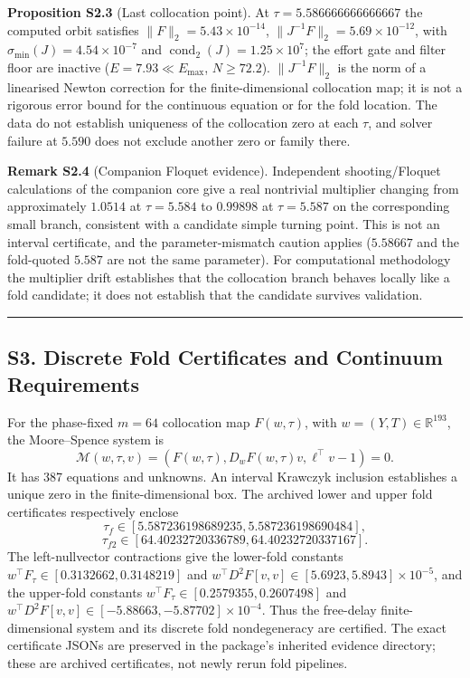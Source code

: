 \documentclass[
  10pt,
  a4paper,
]{article}
\begin{document}
\textbf{Proposition S2.3} (Last collocation point). At
\(\tau = 5.586666666666667\) the computed orbit satisfies
\(\|F\|_2 = 5.43\times10^{-14}\),
\(\|J^{-1}F\|_2 = 5.69\times10^{-12}\), with
\(\sigma_{\min}(J) = 4.54\times10^{-7}\) and
\(\operatorname{cond}_2(J) = 1.25\times10^7\); the effort gate and
filter floor are inactive (\(E = 7.93 \ll E_{\max}\), \(N \ge 72.2\)).
\(\|J^{-1}F\|_2\) is the norm of a linearised Newton correction for the
finite-dimensional collocation map; it is not a rigorous error bound for
the continuous equation or for the fold location. The data do not
establish uniqueness of the collocation zero at each \(\tau\), and
solver failure at \(5.590\) does not exclude another zero or family
there.

\textbf{Remark S2.4} (Companion Floquet evidence). Independent
shooting/Floquet calculations of the companion core give a real
nontrivial multiplier changing from approximately \(1.0514\) at
\(\tau = 5.584\) to \(0.99898\) at \(\tau = 5.587\) on the corresponding
small branch, consistent with a candidate simple turning point. This is
not an interval certificate, and the parameter-mismatch caution applies
(\(5.58667\) and the fold-quoted \(5.587\) are not the same parameter).
For computational methodology the multiplier drift establishes that the
collocation branch behaves locally like a fold candidate; it does not
establish that the candidate survives validation.

\begin{center}\rule{0.5\linewidth}{0.5pt}\end{center}

\subsection{S3. Discrete Fold Certificates and Continuum
Requirements}\label{s3.-discrete-fold-certificates-and-continuum-requirements}

For the phase-fixed \(m=64\) collocation map \(F(w,\tau)\), with
\(w=(Y,T)\in\mathbb R^{193}\), the Moore--Spence system is
\[\mathcal M(w,\tau,v)=(F(w,\tau),D_wF(w,\tau)v,\ell^\top v-1)=0.\] It
has 387 equations and unknowns. An interval Krawczyk inclusion
establishes a unique zero in the finite-dimensional box. The archived
lower and upper fold certificates respectively enclose
\[\tau_f\in[5.587236198689235,5.587236198690484],\]
\[\tau_{f2}\in[64.40232720336789,64.40232720337167].\] The
left-nullvector contractions give the lower-fold constants
\(w^\top F_\tau\in[0.3132662,0.3148219]\) and
\(w^\top D^2F[v,v]\in[5.6923,5.8943]\times10^{-5}\), and the upper-fold
constants \(w^\top F_\tau\in[0.2579355,0.2607498]\) and
\(w^\top D^2F[v,v]\in[-5.88663,-5.87702]\times10^{-4}\). Thus the
free-delay finite-dimensional system and its discrete fold nondegeneracy
are certified. The exact certificate JSONs are preserved in the
package's inherited evidence directory; these are archived certificates,
not newly rerun fold pipelines.
\end{document}
